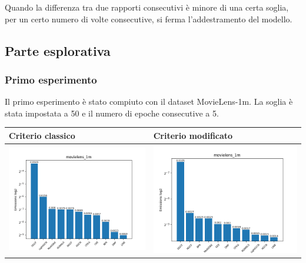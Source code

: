 \noindent Quando la differenza tra due rapporti consecutivi è minore di una certa soglia, per un certo numero di volte consecutive, si ferma l'addestramento del modello.

\subsection{Parte esplorativa}
\subsubsection{Primo esperimento}

Il primo esperimento è stato compiuto con il dataset MovieLens-1m. La soglia è stata impostata a 50 e il numero di epoche consecutive a 5.

\begin{table}[H]
    \centering
    \footnotesize
    \setlength\tabcolsep{0pt}
    \begin{tabularx}{\textwidth}{|X|X|}
        \hline
        \textbf{Criterio classico} & \textbf{Criterio modificato} \\
        \hline
        \includegraphics[width=\linewidth, trim=0 0 0 0]{images/emissions_movielens_1m_earlyClassic.png} &
        \includegraphics[width=\linewidth, trim=0 0 0 0]{images/emissions_movielens_1m_earlyModified.png} \\

\end{tabularx}
\end{table}
